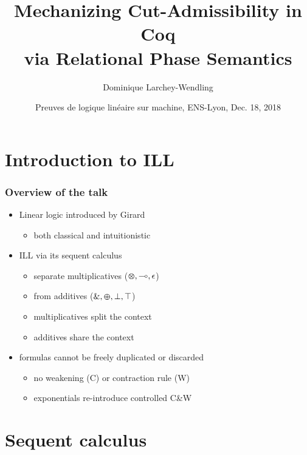 \documentclass[xcolor=pdftex,graphicx=pdftex,12pt]{beamer}
\title{Mechanizing Cut-Admissibility in Coq\\ via Relational Phase Semantics}
\author{Dominique Larchey-Wendling}
\institute{Université de Lorraine, LORIA, CNRS, Nancy, France}
\date{Preuves de logique linéaire sur machine, ENS-Lyon, Dec. 18, 2018}
\newcommand{\seq}{\mathrel\vdash}
\newcommand{\lwith}{\mathbin{\text{\upshape \&}}}
\newcommand{\lplus}{\mathbin{\varoplus}}
\newcommand{\ltime}{\mathbin{\varotimes}}
\newcommand{\lunit}{\mathalpha{\epsilon}}
\newcommand{\limp}{\mathbin{\multimap}}
\newcommand{\ltop}{\mathalpha{\top}}
\newcommand{\lbot}{\mathalpha{\bot}}
\begin{document}
\begin{frame}\titlepage\end{frame}

\section{Introduction to ILL}

\begin{frame}

\frametitle{Overview of the talk}

\begin{itemize}
\item Linear logic introduced by Girard
  \begin{itemize}
  \item both classical and intuitionistic
  \end{itemize}
\item ILL via its sequent calculus
  \begin{itemize}
  \item separate multiplicatives (${\ltime},{\limp},{\lunit}$)
  \item from additives (${\lwith},{\lplus},\lbot, \ltop$)
  \item multiplicatives split the context
  \item additives share the context
  \end{itemize}
\item formulas cannot be freely duplicated or discarded
  \begin{itemize}
  \item no weakening (C) or contraction rule (W)
  \item exponentials re-introduce controlled C\&W
  \end{itemize}
\end{itemize}

\end{frame}

\section{Sequent calculus}

\end{document}
